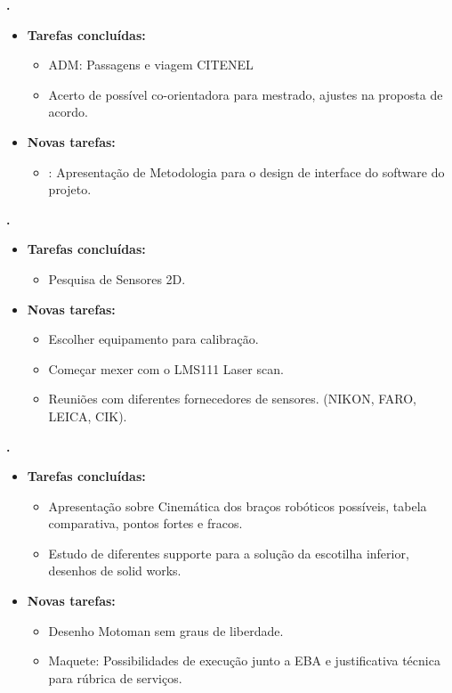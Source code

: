 	\textbf{\julia.} 
	\begin{itemize}
		\item \textbf{Tarefas concluídas:}
			\begin{itemize}    
				\item ADM: Passagens e viagem CITENEL
				\item Acerto de possível co-orientadora para mestrado, ajustes na proposta
				de acordo.
			\end{itemize}
		
		\item \textbf{Novas tarefas:}
			\begin{itemize} 
				\item: Apresentação de Metodologia para o design de interface do software do
				projeto.
			\end{itemize}
	\end{itemize}
					
\textbf{\gabriel.} 
	\begin{itemize}
		\item \textbf{Tarefas concluídas:}
			\begin{itemize}    
				\item Pesquisa de Sensores 2D.
			\end{itemize}
		
		\item \textbf{Novas tarefas:}
			\begin{itemize} 
				\item Escolher equipamento para calibração.
				\item Começar mexer com o LMS111 Laser scan. 
				\item Reuniões com diferentes fornecedores de sensores. (NIKON, FARO,
				LEICA, CIK).
			\end{itemize}
	\end{itemize}
					
			
   \textbf{.} 
	\begin{itemize}
		\item \textbf{Tarefas concluídas:}
			\begin{itemize}    
				\item Apresentação sobre Cinemática dos braços robóticos possíveis, 
				tabela comparativa, pontos fortes e fracos.
				\item Estudo de diferentes supporte para a solução da escotilha inferior,
				desenhos de solid works.
			\end{itemize}
		
		\item \textbf{Novas tarefas:}
			\begin{itemize} 
			    \item Desenho Motoman sem graus de liberdade.
			    \item Maquete: Possibilidades de execução junto a EBA e justificativa
			    técnica para rúbrica de serviços.
			\end{itemize}
	\end{itemize}

